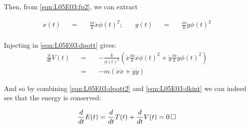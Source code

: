 \documentclass[solutions.tex]{subfiles}
\begin{document}
Then, from \eqref{eqn:L05E03:fp2}, we can extract

\begin{equation*} \begin{aligned}
	x(t) &&=\quad& \frac mk\ddot{x}\phi(t)^2;&\quad
		y(t) &&=\quad& \frac mk\ddot{y}\phi(t)^2 \\
\end{aligned} \end{equation*}

Injecting in \eqref{eqn:L05E03:dpott} gives:
\begin{equation} \begin{aligned}
	\label{eqn:L05E03:dpott2}
	\frac{d}{dt}V(t) &&=\quad& -\frac k{\phi(t)^2}
		\left(\dot{x}\frac mk\ddot{x}\phi(t)^2+\dot{y}\frac mk\ddot{y}\phi(t)^2\right)\\
	~ &&=\quad& -m(\dot{x}\ddot{x}+\dot{y}\ddot{y})
\end{aligned} \end{equation}

And so by combining \eqref{eqn:L05E03:dpott2} and \eqref{eqn:L05E03:dkint} we can indeed
see that the energy is conserved:

\[
	\frac{d}{dt}E(t) = \frac{d}{dt}T(t) + \frac{d}{dt}V(t) = 0 \qed
\]
\end{document}
